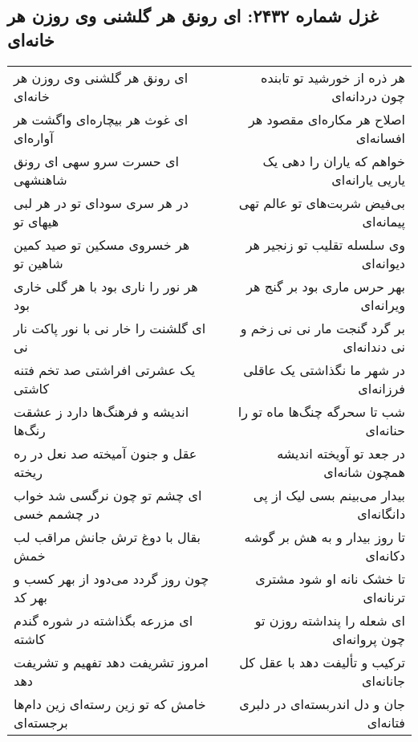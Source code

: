 \begin{center}
\section*{غزل شماره ۲۴۳۲: ای رونق هر گلشنی وی روزن هر خانه‌ای}
\label{sec:2432}
\begin{longtable}{l p{0.5cm} r}
ای رونق هر گلشنی وی روزن هر خانه‌ای
&&
هر ذره از خورشید تو تابنده چون دردانه‌ای
\\
ای غوث هر بیچاره‌ای واگشت هر آواره‌ای
&&
اصلاح هر مکاره‌ای مقصود هر افسانه‌ای
\\
ای حسرت سرو سهی ای رونق شاهنشهی
&&
خواهم که یاران را دهی یک یاریی یارانه‌ای
\\
در هر سری سودای تو در هر لبی هیهای تو
&&
بی‌فیض شربت‌های تو عالم تهی پیمانه‌ای
\\
هر خسروی مسکین تو صید کمین شاهین تو
&&
وی سلسله تقلیب تو زنجیر هر دیوانه‌ای
\\
هر نور را ناری بود با هر گلی خاری بود
&&
بهر حرس ماری بود بر گنج هر ویرانه‌ای
\\
ای گلشنت را خار نی با نور پاکت نار نی
&&
بر گرد گنجت مار نی نی زخم و نی دندانه‌ای
\\
یک عشرتی افراشتی صد تخم فتنه کاشتی
&&
در شهر ما نگذاشتی یک عاقلی فرزانه‌ای
\\
اندیشه و فرهنگ‌ها دارد ز عشقت رنگ‌ها
&&
شب تا سحرگه چنگ‌ها ماه تو را حنانه‌ای
\\
عقل و جنون آمیخته صد نعل در ره ریخته
&&
در جعد تو آویخته اندیشه همچون شانه‌ای
\\
ای چشم تو چون نرگسی شد خواب در چشمم خسی
&&
بیدار می‌بینم بسی لیک از پی دانگانه‌ای
\\
بقال با دوغ ترش جانش مراقب لب خمش
&&
تا روز بیدار و به هش بر گوشه دکانه‌ای
\\
چون روز گردد می‌دود از بهر کسب و بهر کد
&&
تا خشک نانه او شود مشتری ترنانه‌ای
\\
ای مزرعه بگذاشته در شوره گندم کاشته
&&
ای شعله را پنداشته روزن تو چون پروانه‌ای
\\
امروز تشریفت دهد تفهیم و تشریفت دهد
&&
ترکیب و تألیفت دهد با عقل کل جانانه‌ای
\\
خامش که تو زین رسته‌ای زین دام‌ها برجسته‌ای
&&
جان و دل اندربسته‌ای در دلبری فتانه‌ای
\\
\end{longtable}
\end{center}
